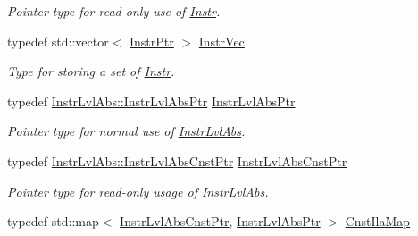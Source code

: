 \begin{DoxyCompactItemize}
\begin{DoxyCompactList}\small\item\em Pointer type for read-\/only use of \mbox{\hyperlink{classilang_1_1_instr}{Instr}}. \end{DoxyCompactList}\item 
\mbox{\label{namespaceilang_a35e6555f156373812f16030b98c42e65}} 
typedef std\+::vector$<$ \mbox{\hyperlink{namespaceilang_af88a19312ae653d687a0d1207bb284f6}{Instr\+Ptr}} $>$ \mbox{\hyperlink{namespaceilang_a35e6555f156373812f16030b98c42e65}{Instr\+Vec}}
\begin{DoxyCompactList}\small\item\em Type for storing a set of \mbox{\hyperlink{classilang_1_1_instr}{Instr}}. \end{DoxyCompactList}\item 
\mbox{\label{namespaceilang_ad1b30fdf347e493b3937143da05d1a72}} 
typedef \mbox{\hyperlink{classilang_1_1_instr_lvl_abs_a743fd98e5ad145d70cb0dabf8db0007c}{Instr\+Lvl\+Abs\+::\+Instr\+Lvl\+Abs\+Ptr}} \mbox{\hyperlink{namespaceilang_ad1b30fdf347e493b3937143da05d1a72}{Instr\+Lvl\+Abs\+Ptr}}
\begin{DoxyCompactList}\small\item\em Pointer type for normal use of \mbox{\hyperlink{classilang_1_1_instr_lvl_abs}{Instr\+Lvl\+Abs}}. \end{DoxyCompactList}\item 
\mbox{\label{namespaceilang_adc86156b73aa1a4b6369645e9b96ff19}} 
typedef \mbox{\hyperlink{classilang_1_1_instr_lvl_abs_a57464e2e6a69327715fa88963ebfb282}{Instr\+Lvl\+Abs\+::\+Instr\+Lvl\+Abs\+Cnst\+Ptr}} \mbox{\hyperlink{namespaceilang_adc86156b73aa1a4b6369645e9b96ff19}{Instr\+Lvl\+Abs\+Cnst\+Ptr}}
\begin{DoxyCompactList}\small\item\em Pointer type for read-\/only usage of \mbox{\hyperlink{classilang_1_1_instr_lvl_abs}{Instr\+Lvl\+Abs}}. \end{DoxyCompactList}\item 
\mbox{\label{namespaceilang_a4e780d7b16cb21d2c10f955c504e7356}} 
typedef std\+::map$<$ \mbox{\hyperlink{namespaceilang_adc86156b73aa1a4b6369645e9b96ff19}{Instr\+Lvl\+Abs\+Cnst\+Ptr}}, \mbox{\hyperlink{namespaceilang_ad1b30fdf347e493b3937143da05d1a72}{Instr\+Lvl\+Abs\+Ptr}} $>$ \mbox{\hyperlink{namespaceilang_a4e780d7b16cb21d2c10f955c504e7356}{Cnst\+Ila\+Map}}

\end{DoxyCompactItemize}
